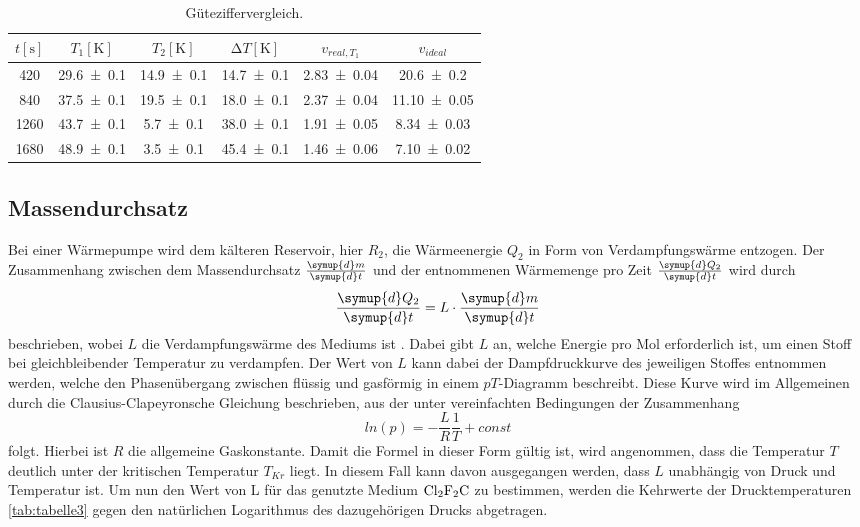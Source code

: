 \begin{table}[H]
  \centering
  \caption{Güteziffervergleich.}
  \label{tab:tabelle2}
\begin{tabular}{c c c c c c}
  \toprule
  {$t [\si{\second}]$} & {$T_1 [\si{\kelvin}]$} & {$T_2 [\si{\kelvin}]$} & {$\increment{T} [\si{\kelvin}]$} & {$v_{real, T_1}$} & {$v_{ideal}$}\\
  \midrule
  \num{420} & \num{29.6 +- 0.1} & \num{14.9 +- 0.1} & \num{14.7 +- 0.1} & \num{2.83 +- 0.04} & \num{20.6 +- 0.2} \\
  \num{840} & \num{37.5 +- 0.1} & \num{19.5 +- 0.1} & \num{18.0 +- 0.1} & \num{2.37 +- 0.04} & \num{11.10 +- 0.05}  \\
  \num{1260} & \num{43.7 +- 0.1} & \num{5.7 +- 0.1} & \num{38.0 +- 0.1} & \num{1.91 +- 0.05} & \num{8.34 +- 0.03}  \\
  \num{1680} & \num{48.9 +- 0.1} & \num{3.5 +- 0.1} & \num{45.4 +- 0.1} & \num{1.46 +- 0.06} & \num{7.10 +- 0.02}  \\
  \bottomrule
\end{tabular}
\end{table}

\subsection{Massendurchsatz}
Bei einer Wärmepumpe wird dem kälteren Reservoir, hier $R_2$, die Wärmeenergie $Q_2$ in Form von Verdampfungswärme entzogen.
Der Zusammenhang zwischen dem Massendurchsatz $\frac{\symup{d} m}{\symup{d} t}$ und der entnommenen Wärmemenge pro Zeit $\frac{\symup{d} Q_2}{\symup{d} t}$ wird durch
\begin{equation}
  \frac{\symup{d} Q_2}{\symup{d}t} = L \cdot \frac{\symup{d} m}{\symup{d} t}
    \label{eqn:md}
\end{equation}
beschrieben, wobei $L$ die Verdampfungswärme des Mediums ist \cite{V203}.
Dabei gibt $L$ an, welche Energie pro Mol erforderlich ist, um einen Stoff bei gleichbleibender Temperatur zu verdampfen.
Der Wert von $L$ kann dabei der Dampfdruckkurve des jeweiligen Stoffes entnommen werden, welche den Phasenübergang zwischen flüssig und gasförmig in einem $pT$-Diagramm beschreibt.
Diese Kurve wird im Allgemeinen durch die Clausius-Clapeyronsche Gleichung beschrieben, aus der unter vereinfachten Bedingungen der Zusammenhang
\begin{equation}
  ln(p)= -\frac{L}{R}\frac{1}{T} + const
  \label{eqn:ccg}
\end{equation}
folgt.
Hierbei ist $R$ die allgemeine Gaskonstante.
Damit die Formel in dieser Form gültig ist, wird angenommen, dass die Temperatur $T$ deutlich unter der kritischen Temperatur $T_{Kr}$ liegt.
In diesem Fall kann davon ausgegangen werden, dass $L$ unabhängig von Druck und Temperatur ist.
Um nun den Wert von L für das genutzte Medium $\ce{Cl2F2C}$ zu bestimmen, werden die Kehrwerte der Drucktemperaturen \ref{tab:tabelle3} gegen den natürlichen Logarithmus des dazugehörigen Drucks abgetragen.

